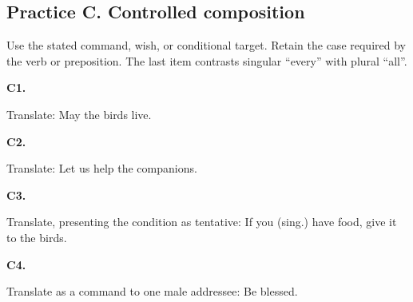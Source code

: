 \subsection*{Practice C. Controlled composition}

Use the stated command, wish, or conditional target. Retain the case required by the verb or preposition. The last item contrasts singular “every” with plural “all”.

\par\begin{minipage}{\linewidth}\raggedright
\textbf{C1.}

Translate: May the birds live.

\end{minipage}\par\addvspace{4pt}

\par\begin{minipage}{\linewidth}\raggedright
\textbf{C2.}

Translate: Let us help the companions.

\end{minipage}\par\addvspace{4pt}

\par\begin{minipage}{\linewidth}\raggedright
\textbf{C3.}

Translate, presenting the condition as tentative: If you (sing.) have food, give it to the birds.

\end{minipage}\par\addvspace{4pt}

\par\begin{minipage}{\linewidth}\raggedright
\textbf{C4.}

Translate as a command to one male addressee: Be blessed.

\end{minipage}\par\addvspace{4pt}

